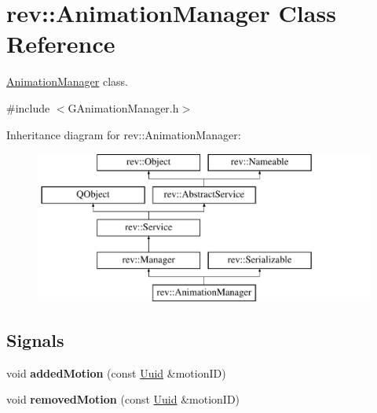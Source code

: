 \hypertarget{classrev_1_1_animation_manager}{}\section{rev\+::Animation\+Manager Class Reference}
\label{classrev_1_1_animation_manager}


\mbox{\hyperlink{classrev_1_1_animation_manager}{Animation\+Manager}} class.  




{\ttfamily \#include $<$G\+Animation\+Manager.\+h$>$}

Inheritance diagram for rev\+::Animation\+Manager\+:\begin{figure}[H]
\begin{center}
\leavevmode
\includegraphics[height=5.000000cm]{classrev_1_1_animation_manager}
\end{center}
\end{figure}
\subsection*{Signals}
\begin{DoxyCompactItemize}
\item 
\mbox{\label{classrev_1_1_animation_manager_ad3db3464d9362909800a7e0d4d996552}} 
void {\bfseries added\+Motion} (const \mbox{\hyperlink{classrev_1_1_uuid}{Uuid}} \&motion\+ID)
\item 
\mbox{\label{classrev_1_1_animation_manager_a82aac0ef62aae2f55f28c8b54d0bfd3e}} 
void {\bfseries removed\+Motion} (const \mbox{\hyperlink{classrev_1_1_uuid}{Uuid}} \&motion\+ID)
\end{DoxyCompactItemize}

